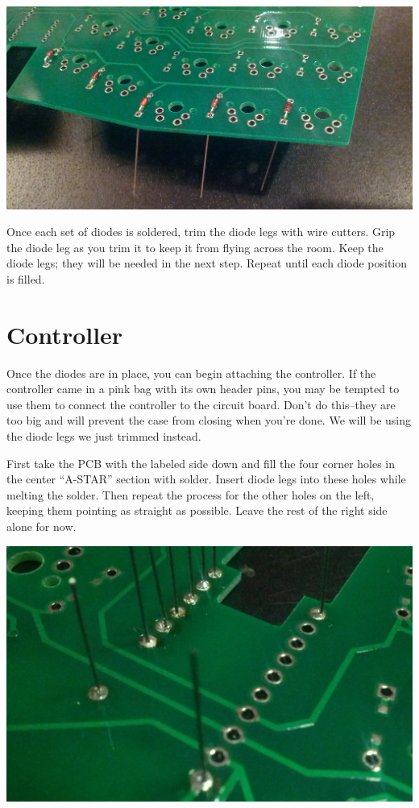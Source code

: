 \documentclass[landscape,twocolumn]{article}
\begin{document}
\vspace{1em}
\includegraphics[width=\columnwidth]{diodes.jpg}
\vspace{1em}

Once each set of diodes is soldered, trim the diode legs with wire
cutters. Grip the diode leg as you trim it to keep it from flying
across the room. Keep the diode legs; they will be needed in the next
step. Repeat until each diode position is filled.

\section{Controller}

Once the diodes are in place, you can begin attaching the controller.
If the controller came in a pink bag with its own header pins, you may
be tempted to use them to connect the controller to the circuit
board. Don't do this--they are too big and will prevent the case from
closing when you're done. We will be using the diode legs we just
trimmed instead.

\vspace{1em}

First take the PCB with the labeled side down and fill the four corner
holes in the center ``A-STAR'' section with solder. Insert diode legs
into these holes while melting the solder. Then repeat the process for
the other holes on the left, keeping them pointing as straight as
possible. Leave the rest of the right side alone for now.

\vspace{1em}
\begin{center}\includegraphics[width=0.8\columnwidth]{many-pins.jpg}\end{center}
\vspace{1em}
\end{document}
